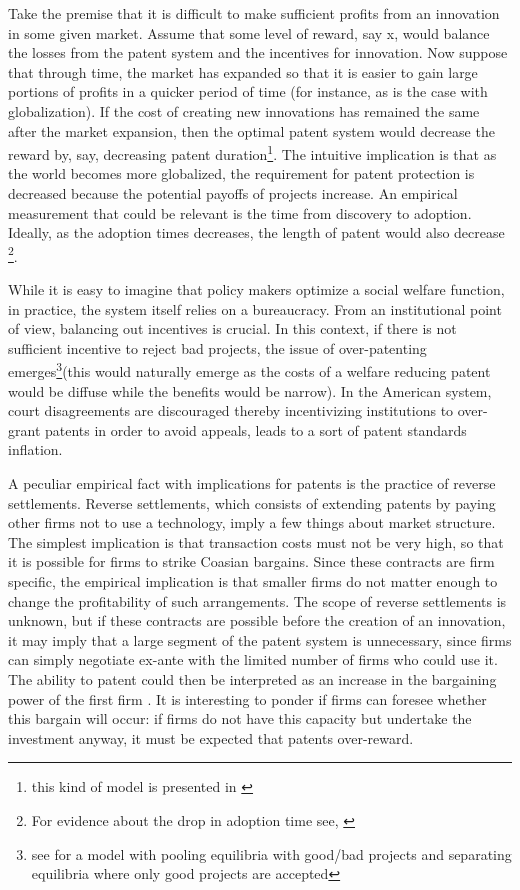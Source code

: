 Take the premise that it is difficult to make sufficient profits from an innovation in some given market. Assume that some level of reward, say x, would balance the losses from the patent system and the incentives for innovation. Now suppose that through time, the market has expanded so that it is easier to gain large portions of profits in a quicker period of time (for instance, as is the case with globalization). If the cost of creating new innovations has remained the same after the market expansion, then the optimal patent system would decrease the reward by, say, decreasing patent duration\footnote{this kind of model is presented in \cite{boldrin2009market} }. The intuitive implication is that as the world becomes more globalized, the requirement for patent protection is decreased because the potential payoffs of projects increase. An empirical measurement that could be relevant is the time from discovery to adoption. Ideally, as the adoption times decreases, the length of patent would also decrease \footnote{For evidence about the drop in adoption time see, \cite{comin2006five}}. 

While it is easy to imagine that policy makers optimize a social welfare function, in practice, the system itself relies on a bureaucracy. From an institutional point of view, balancing out incentives is crucial. In this context, if there is not sufficient incentive to reject bad projects, the issue of over-patenting emerges\footnote{see \cite{Caillaud2012} for a model with pooling equilibria with good/bad projects and separating equilibria where only good projects are accepted}(this would naturally emerge as the costs of a welfare reducing patent would be diffuse while the benefits would be narrow). In the American system, court disagreements are discouraged thereby incentivizing institutions to over-grant patents in order to avoid appeals, leads to a sort of patent standards inflation\citep{Masur2011}.

A peculiar empirical fact with implications for patents is the practice of reverse settlements. Reverse settlements, which consists of extending patents by paying other firms not to use a technology, imply a few things about market structure. The simplest implication is that transaction costs must not be very high, so that it is possible for firms to strike Coasian bargains. Since these contracts are firm specific, the empirical implication is that smaller firms do not matter enough to change the profitability of such arrangements. The scope of reverse settlements is unknown, but if these contracts are possible before the creation of an innovation, it may imply that a large segment of the patent system is unnecessary, since firms can simply negotiate ex-ante with the limited number of firms who could use it. The ability to patent could then be interpreted as an increase in the bargaining power of the first firm \citep{Green1995}. It is interesting to ponder if firms can foresee whether this bargain will occur: if firms do not have this capacity but undertake the investment anyway, it must be expected that patents over-reward.

